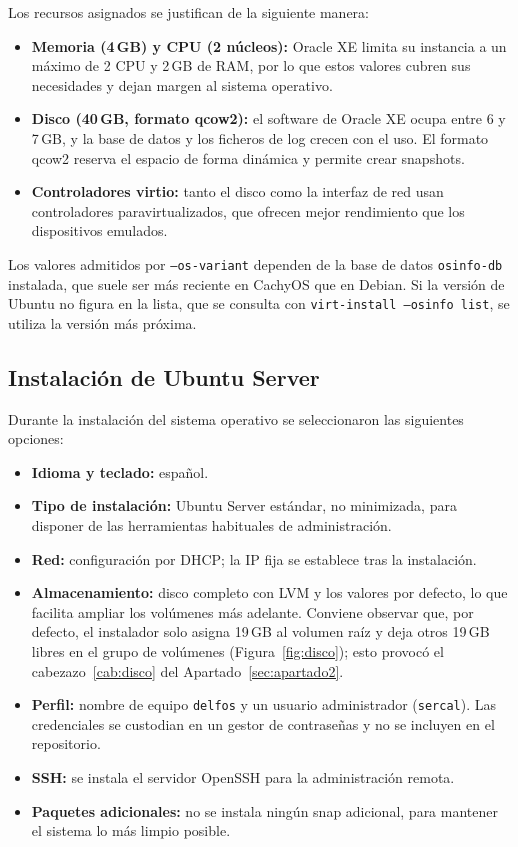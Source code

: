 Los recursos asignados se justifican de la siguiente manera:

\begin{itemize}
    \item \textbf{Memoria (4\,GB) y CPU (2 núcleos):} Oracle XE limita su instancia a un máximo de 2 CPU y 2\,GB de RAM, por lo que estos valores cubren sus necesidades y dejan margen al sistema operativo.
    \item \textbf{Disco (40\,GB, formato qcow2):} el software de Oracle XE ocupa entre 6 y 7\,GB, y la base de datos y los ficheros de log crecen con el uso. El formato qcow2 reserva el espacio de forma dinámica y permite crear snapshots.
    \item \textbf{Controladores virtio:} tanto el disco como la interfaz de red usan controladores paravirtualizados, que ofrecen mejor rendimiento que los dispositivos emulados.
\end{itemize}

Los valores admitidos por \texttt{--os-variant} dependen de la base de datos \texttt{osinfo-db} instalada, que suele ser más reciente en CachyOS que en Debian. Si la versión de Ubuntu no figura en la lista, que se consulta con \texttt{virt-install --osinfo list}, se utiliza la versión más próxima.

\subsection{Instalación de Ubuntu Server}

Durante la instalación del sistema operativo se seleccionaron las siguientes opciones:

\begin{itemize}
    \item \textbf{Idioma y teclado:} español.
    \item \textbf{Tipo de instalación:} Ubuntu Server estándar, no minimizada, para disponer de las herramientas habituales de administración.
    \item \textbf{Red:} configuración por DHCP; la IP fija se establece tras la instalación.
    \item \textbf{Almacenamiento:} disco completo con LVM y los valores por defecto, lo que facilita ampliar los volúmenes más adelante. Conviene observar que, por defecto, el instalador solo asigna 19\,GB al volumen raíz y deja otros 19\,GB libres en el grupo de volúmenes (Figura~\ref{fig:disco}); esto provocó el cabezazo~\ref{cab:disco} del Apartado~\ref{sec:apartado2}.
    \item \textbf{Perfil:} nombre de equipo \texttt{delfos} y un usuario administrador (\texttt{sercal}). Las credenciales se custodian en un gestor de contraseñas y no se incluyen en el repositorio.
    \item \textbf{SSH:} se instala el servidor OpenSSH para la administración remota.
    \item \textbf{Paquetes adicionales:} no se instala ningún snap adicional, para mantener el sistema lo más limpio posible.
\end{itemize}

